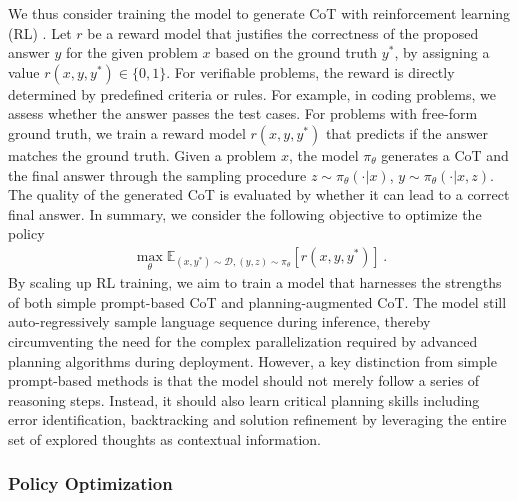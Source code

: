 \documentclass{article}
\newcommand{\citep}[1]{\parencite{#1}}
\begin{document}
We thus consider training the model to generate CoT with reinforcement learning (RL) \citep{o12024}.   
Let $r$ be a reward model that justifies the correctness of the proposed answer $y$  for the given problem $x$ based on the ground truth $y^*$, by assigning a value $r(x, y, y^*)\in \{0,1\}$. 
For verifiable problems, the reward is directly determined by predefined criteria or rules. For example, in coding problems, we assess whether the answer passes the test cases. For problems with free-form ground truth, we train a reward model $r(x, y, y^*)$ that predicts if the answer matches the ground truth. 
Given a problem $x$, the model $\pi_\theta$ generates a CoT and the final answer through the sampling procedure $z\sim\pi_\theta(\cdot | x)$, $y\sim\pi_\theta(\cdot |x, z)$. 
The quality of the generated CoT is evaluated by whether it can lead to a correct final answer. 
In summary, we consider the following objective to optimize the policy
\begin{align}
\max_\theta \mathbb{E}_{(x, y^*)\sim\mathcal{D}, (y, z)\sim\pi_\theta}\left[ r(x, y, y^*) \right]\, .
\end{align}
By scaling up RL training, we aim to train a model that harnesses the strengths of both simple prompt-based CoT and planning-augmented CoT. 
The model still auto-regressively sample language sequence during inference, thereby circumventing the need for the complex parallelization required by advanced planning algorithms during deployment. 
However, a key distinction from simple prompt-based methods is that the model should not merely  follow a series of reasoning steps. Instead, it should also learn critical planning skills including error identification, backtracking and solution refinement by leveraging the entire set of explored thoughts as contextual information. 

\subsubsection{Policy Optimization}
\end{document}
